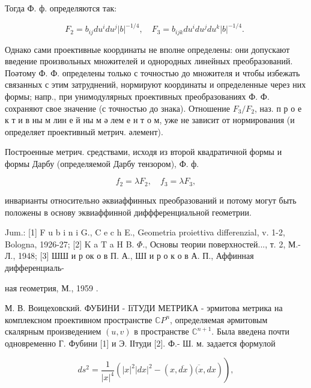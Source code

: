 \documentclass[10pt]{article}
\begin{document}
Тогда Ф. ф. определяются так:



\[

F_{2}=b_{i j} d u^{i} d u^{j}|b|^{-1 / 4}, \quad F_{3}=b_{i j k} d u^{i} d u^{j} d u^{k}|b|^{-1 / 4} \text {. }

\]



Однако сами проективные координаты не вполне определены: они допускают введение произвольных множителей и однородных линейных преобразований. Поәтому Ф. Ф. определены только с точностью до множителя и чтобы избежать связанных с этим затруднений, нормируют координаты и определенные через них формы; напр., при унимодулярных проективных преобразованиях Ф. Ф. сохраняют свое значение (с точностью до знака). Отношение $F_{3} / F_{2}$, наз. п р о е к т и в ны м лин е й ны м ә лем е н т о м, уже не зависит от нормирования (и определяет проективный метрич. әлемент).



Построенные метрич. средствами, исходя из второй квадратичной формы и формы Дарбу (определяемой Дарбу тензором), Ф. ф.



\[

f_{2}=\lambda F_{2}, \quad f_{3}=\lambda F_{3},

\]



инварианты относительно әквиаффинных преобразований и потому могут быть положены в основу эквиаффинной диффференциальной геометрии.



Jum.: [1] F u b i n i G., C e c h E., Geometria proiettiva differenzial, v. 1-2, Bologna, 1926-27; [2] K a $\mathrm{T}$ a $\mathrm{H}$ B. $\Phi$., Основы теории поверхностей..., т. 2, М.-Л., 1948; [3] ШШ и р ок о в П. А., ШІ и р о к о в А. П., Аффинная дифференциаль-

ная геометрия, М., 1959 .

М. В. Воицеховский. ФУБИНИ - IїТУДИ МЕТРИКА - эрмитова метрика на комплексном проективном пространстве $\mathbb{C} P^{n}$, определяемая әрмитовым скалярным произведением $(u, v)$ в пространстве $\mathbb{C}^{n+1}$. Была введена почти одновременно Г. Фубини [1] и Э. ІІтуди [2]. Ф.- Ш. м. задается формулой



\[

\left.d s^{2}=\frac{1}{|x|^{4}}\left(|x|^{2}|d x|^{2}-(x, \overline{d x}) \overline{(x}, d x\right)\right),

\]
\end{document}
